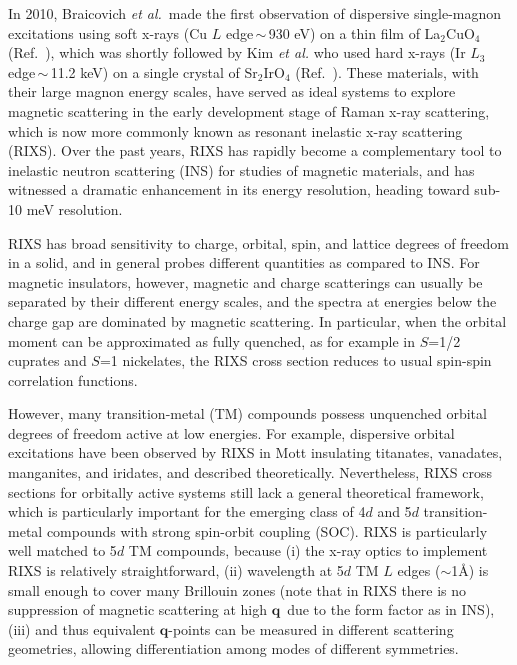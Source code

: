 \documentclass[twocolumn,prb,aps,showpacs,superscriptaddress]{revtex4-1}
\newcommand{\q}{$\mathbf{q}$}
\begin{document}
In 2010, Braicovich {\it et al.}~made the first observation of dispersive
single-magnon excitations using soft x-rays (Cu $L$ edge\,$\sim$\,930 eV) on a
thin film of La$_2$CuO$_4$ (Ref.~), which was shortly
followed by Kim {\it et al.} who used hard x-rays (Ir $L_3$ edge\,$\sim$\,11.2
keV) on a single crystal of Sr$_2$IrO$_4$ (Ref.~). These
materials, with their large magnon energy scales, have served as ideal systems
to explore magnetic scattering in the 
early development stage of Raman x-ray scattering, which is now more commonly
known as resonant inelastic x-ray scattering (RIXS). Over the past years, RIXS
has rapidly become a complementary tool to inelastic neutron scattering (INS)
for studies of magnetic materials, and has witnessed a dramatic enhancement in
its energy resolution, heading toward sub-10 meV resolution\cite{Kim17}. 

RIXS has broad sensitivity to charge, orbital, spin, and lattice degrees of
freedom in a solid, and in general probes different quantities as compared to
INS. For magnetic insulators, however, magnetic and charge scatterings can
usually be separated by their different energy scales, and the spectra at
energies below the charge gap are dominated by magnetic scattering. In
particular, when the orbital moment can be approximated as fully quenched, as
for example in $S$=1/2 cuprates and $S$=1 nickelates, the RIXS cross section
reduces to usual spin-spin correlation 
functions\cite{AmentPRL09,HaverkortPRL10}.  

However, many transition-metal (TM) compounds possess unquenched orbital
degrees of freedom active at low energies\cite{Khaliullin05}. For example,
dispersive orbital excitations have been observed by RIXS in Mott insulating
titanates\cite{Ulr09}, vanadates\cite{Ben13}, manganites\cite{Web10}, and
iridates\cite{KimPRL12,Kim14,YJK17}, and described
theoretically\cite{KimPRL12,AmentPRB09,Kim14}. Nevertheless, RIXS cross 
sections for orbitally active systems still lack a general theoretical 
framework, which is particularly important for the emerging class
of 4$d$ and 5$d$ transition-metal compounds with strong spin-orbit 
coupling (SOC). RIXS is particularly well matched to 5$d$ TM compounds, 
because (i) the x-ray optics to implement RIXS is relatively 
straightforward\cite{Gog13}, (ii) wavelength at
5$d$ TM $L$ edges ($\sim$1$\textrm{\AA}$) is small enough to cover many
Brillouin zones (note that in RIXS there is no suppression of magnetic
scattering at high \q\ due to the form factor as in INS), (iii) and thus
equivalent $\mathbf{q}$-points can be measured in different scattering
geometries, allowing differentiation among modes of different symmetries.  
\end{document}
